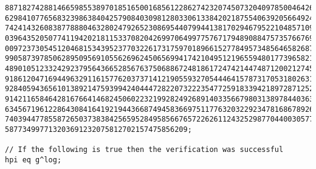 \documentclass[11pt]{llncs}
\begin{document}
\begin{subappendices}
{\begin{verbatim}
8871827428814665985538970185165001685612286274232074507320409785004642623288826337885633979749912868706827\
6298410776568323986384042579084030981280330613384202187554063920566492475619142508184504623103906907672760\
7424143260838778880463280247926523086954407994413817029467952210485710953835097102601108914410928658908288\
0396435205077411942021811533708204269970649977576717948908847573576676954706746170190144031913873215938734\
0097237305451204681534395237703226173175970189661527784957348564658268714614824589610076901495742866042611\
9905873978506289509569105562696245065699417421049512196559480177396582198913305505623780221356128417075902\
4890105123324292379564366528567637506886724818617247421447487120021274588245933610907789638096241131835623\
9186120471694496329116157762037371412190559327054446415787317053180263168201722831458633332659136449725605\
9284059436561013892147593994240444728220732223547725918339421897287125251936596528047937761314579761653696\
9142116584642816766414682450602232199282492689140335667980313897844036321338008062813277715242334981388978\
6345671961228643084164192194436687494583669751177632032292347816867892619444681624062612125673635499520281\
7403944778558726503738384256595284958566765722626112432529877044003057744040222897210799267196210596030326\
587734997713203691232075812702157475856209;

// If the following is true then the verification was successful
hpi eq g^log;
\end{verbatim}}

\end{subappendices}
  
 



\end{document}
